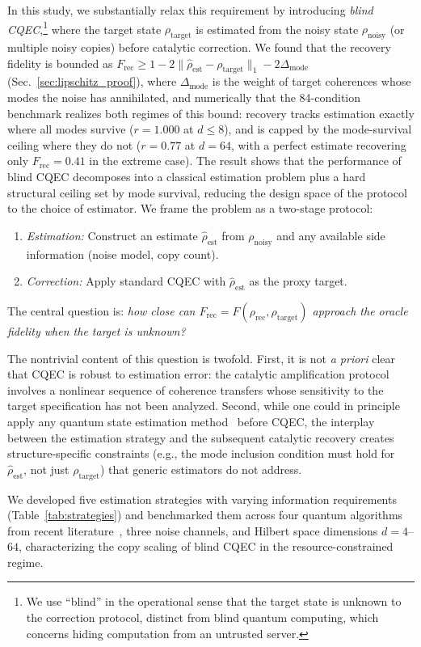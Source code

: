 \documentclass[12pt,a4paper]{article}
\newcommand{\Frec}{F_\mathrm{rec}}
\newcommand{\rhot}{\rho_\mathrm{target}}
\newcommand{\rhon}{\rho_\mathrm{noisy}}
\newcommand{\rhor}{\rho_\mathrm{rec}}
\newcommand{\rhoe}{\hat{\rho}_\mathrm{est}}
\begin{document}
In this study, we substantially relax this requirement by introducing \emph{blind CQEC},\footnote{We use ``blind'' in the operational sense that the target state is unknown to the correction protocol, distinct from blind quantum computing, which concerns hiding computation from an untrusted server.} where the target state $\rhot$ is estimated from the noisy state $\rhon$ (or multiple noisy copies) before catalytic correction.
We found that the recovery fidelity is bounded as $\Frec \geq 1 - 2\|\rhoe - \rhot\|_1 - 2\Delta_\mathrm{mode}$ (Sec.~\ref{sec:lipschitz_proof}), where $\Delta_\mathrm{mode}$ is the weight of target coherences whose modes the noise has annihilated, and numerically that the 84-condition benchmark realizes both regimes of this bound: recovery tracks estimation exactly where all modes survive ($r = 1.000$ at $d \leq 8$), and is capped by the mode-survival ceiling where they do not ($r = 0.77$ at $d = 64$, with a perfect estimate recovering only $\Frec = 0.41$ in the extreme case).
The result shows that the performance of blind CQEC decomposes into a classical estimation problem plus a hard structural ceiling set by mode survival, reducing the design space of the protocol to the choice of estimator.
We frame the problem as a two-stage protocol:
\begin{enumerate}
\item \emph{Estimation:} Construct an estimate $\rhoe$ from $\rhon$ and any available side information (noise model, copy count).
\item \emph{Correction:} Apply standard CQEC with $\rhoe$ as the proxy target.
\end{enumerate}
The central question is: \emph{how close can $\Frec = F(\rhor, \rhot)$ approach the oracle fidelity when the target is unknown?}

The nontrivial content of this question is twofold.
First, it is not \emph{a priori} clear that CQEC is robust to estimation error: the catalytic amplification protocol involves a nonlinear sequence of coherence transfers whose sensitivity to the target specification has not been analyzed.
Second, while one could in principle apply any quantum state estimation method~\cite{Hradil1997,Gross2010,Haah2017} before CQEC, the interplay between the estimation strategy and the subsequent catalytic recovery creates structure-specific constraints (e.g., the mode inclusion condition must hold for $\rhoe$, not just $\rhot$) that generic estimators do not address.

We developed five estimation strategies with varying information requirements (Table~\ref{tab:strategies}) and benchmarked them across four quantum algorithms from recent literature~\cite{Chen2021,Ivashkov2024,Clinton2026,Regev2024}, three noise channels, and Hilbert space dimensions $d = 4$--$64$, characterizing the copy scaling of blind CQEC in the resource-constrained regime.
\end{document}
